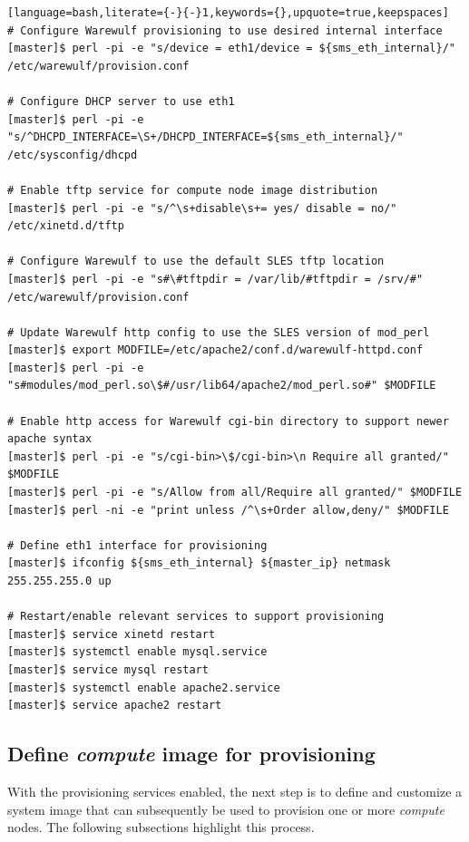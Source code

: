 \documentclass[letterpaper]{article}
\begin{document}
\begin{lstlisting}[language=bash,literate={-}{-}1,keywords={},upquote=true,keepspaces]
# Configure Warewulf provisioning to use desired internal interface
[master]$ perl -pi -e "s/device = eth1/device = ${sms_eth_internal}/" /etc/warewulf/provision.conf

# Configure DHCP server to use eth1
[master]$ perl -pi -e "s/^DHCPD_INTERFACE=\S+/DHCPD_INTERFACE=${sms_eth_internal}/" /etc/sysconfig/dhcpd

# Enable tftp service for compute node image distribution
[master]$ perl -pi -e "s/^\s+disable\s+= yes/ disable = no/" /etc/xinetd.d/tftp

# Configure Warewulf to use the default SLES tftp location
[master]$ perl -pi -e "s#\#tftpdir = /var/lib/#tftpdir = /srv/#" /etc/warewulf/provision.conf

# Update Warewulf http config to use the SLES version of mod_perl
[master]$ export MODFILE=/etc/apache2/conf.d/warewulf-httpd.conf
[master]$ perl -pi -e "s#modules/mod_perl.so\$#/usr/lib64/apache2/mod_perl.so#" $MODFILE

# Enable http access for Warewulf cgi-bin directory to support newer apache syntax
[master]$ perl -pi -e "s/cgi-bin>\$/cgi-bin>\n Require all granted/" $MODFILE
[master]$ perl -pi -e "s/Allow from all/Require all granted/" $MODFILE
[master]$ perl -ni -e "print unless /^\s+Order allow,deny/" $MODFILE

# Define eth1 interface for provisioning
[master]$ ifconfig ${sms_eth_internal} ${master_ip} netmask 255.255.255.0 up

# Restart/enable relevant services to support provisioning
[master]$ service xinetd restart
[master]$ systemctl enable mysql.service
[master]$ service mysql restart                          
[master]$ systemctl enable apache2.service
[master]$ service apache2 restart
\end{lstlisting}


\subsection{Define {\em compute} image for provisioning}

With the provisioning services enabled, the next step is to define and
customize a system image that can subsequently be used to provision one or more
{\em compute} nodes. The following subsections highlight this process.
\end{document}
